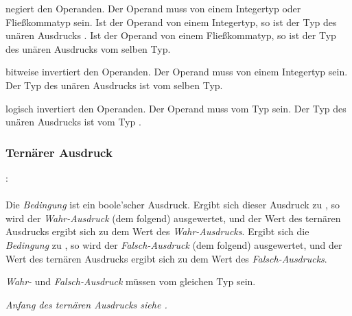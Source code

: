 \op{-} negiert den Operanden. Der Operand muss von einem Integertyp oder Fließkommatyp sein.
Ist der Operand von einem Integertyp, so ist der Typ des unären Ausdrucks .
Ist der Operand von einem Fließkommatyp, so ist der Typ des unären Ausdrucks vom selben Typ.

\op{$\sim$} bitweise invertiert den Operanden. Der Operand muss von einem Integertyp sein. Der Typ des unären Ausdrucks ist vom selben Typ.

\op{!} logisch invertiert den Operanden. Der Operand muss vom Typ  sein. Der Typ des unären Ausdrucks ist vom Typ .

\subsubsection{Ternärer Ausdruck}\label{Ternaerer Ausdruck}
:\label{asdr_ternaer_suffix}\\
\hspace*{1cm}\Gspace{} \Gspace\Gt{:}\Gspace{} \\

Die \emph{Bedingung} ist ein boole'scher Ausdruck. Ergibt sich dieser Ausdruck zu ,
so wird der \emph{Wahr-Ausdruck} (dem  folgend) ausgewertet, und der Wert des ternären
Ausdrucks ergibt sich zu dem Wert des \emph{Wahr-Ausdrucks}.
Ergibt sich die \emph{Bedingung} zu , so wird der \emph{Falsch-Ausdruck} (dem \kw{:} folgend)
ausgewertet, und der Wert des ternären
Ausdrucks ergibt sich zu dem Wert des \emph{Falsch-Ausdrucks}.

\emph{Wahr-} und \emph{Falsch-Ausdruck} müssen vom gleichen Typ sein.

\emph{Anfang des ternären Ausdrucks siehe .}


